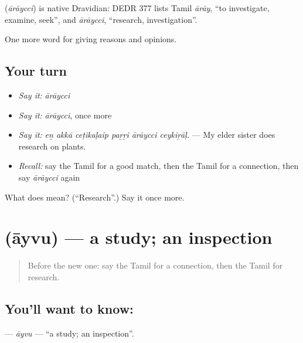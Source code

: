 \begin{cousinweb}
\textbf{} (\emph{ārāycci}) is native Dravidian: DEDR 377 lists Tamil \emph{ārāy}, \textquotedblleft{}to investigate, examine, seek\textquotedblright{}, and \emph{ārāycci}, \textquotedblleft{}research, investigation\textquotedblright{}.
\end{cousinweb}

\begin{grammarlens}[title={What you've built}]
One more word for giving reasons and opinions.
\end{grammarlens}

\subsection*{Your turn}
\begin{itemize}
\raggedright
  \item \emph{Say it:} \emph{ārāycci}
  \item \emph{Say it:} \emph{ārāycci}, once more
  \item \emph{Say it:} \emph{eṉ akkā ceṭikaḷaip paṟṟi ārāycci ceykiṟāḷ.} — My elder sister does research on plants.
  \item \emph{Recall:} say the Tamil for a good match, then the Tamil for a connection, then say \emph{ārāycci} again
\end{itemize}

\begin{tcolorbox}[breakable,colback=teal!4,colframe=teal!35!black,title={Before you move on}]
What does  mean? (\textquotedblleft{}Research\textquotedblright{}.) Say it once more.
\end{tcolorbox}
\section[\texorpdfstring{\ta{ஆய்வு} (āyvu)}{ஆய்வு (āyvu)}]{ (āyvu) — a study; an inspection}

\label{lesson:TA-C362-ayvu}



\begin{quote}
Before the new one: say the Tamil for a connection, then the Tamil for research.
\end{quote}

\subsection*{You'll want to know: }
\textbf{} — \emph{āyvu} — \textquotedblleft{}a study; an inspection\textquotedblright{}.

